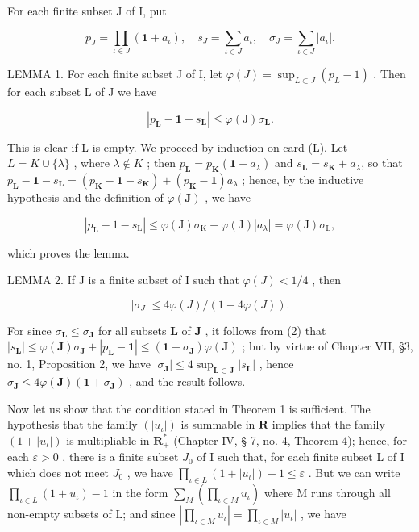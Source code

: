 For each finite subset J of I, put

\[
p _ {J} = \prod_ {\iota \in J} (\mathbf{1} + a _ {\iota}), \quad s _ {J} = \sum_ {\iota \in J} a _ {\iota}, \quad \sigma_ {J} = \sum_ {\iota \in J} | a _ {\iota} |.
\]

LEMMA 1. For each finite subset J of I, let \(\varphi(J) = \sup_{L \subset J} (p_L - 1)\) . Then for each subset L of J we have

\[
\left| p _ {\mathbf {L}} - \mathbf {1} - s _ {\mathbf {L}} \right| \leqslant \varphi (\mathrm{J}) \sigma_ {\mathbf {L}}.\tag{2}
\]

This is clear if L is empty. We proceed by induction on card (L). Let \(L = K \cup \{\lambda\}\) , where \(\lambda \notin K\) ; then \(p_{\mathbf{L}} = p_{\mathbf{K}}(\mathbf{1} + a_{\lambda})\) and \(s_{\mathbf{L}} = s_{\mathbf{K}} + a_{\lambda}\), so that \(p_{\mathbf{L}} - \mathbf{1} - s_{\mathbf{L}} = (p_{\mathbf{K}} - \mathbf{1} - s_{\mathbf{K}}) + (p_{\mathbf{K}} - \mathbf{1})a_{\lambda}\) ; hence, by the inductive hypothesis and the definition of \(\varphi(\mathbf{J})\) , we have

\[
\left| p _ {\mathrm{L}} - \mathrm{1} - s _ {\mathrm{L}} \right| \leqslant \varphi (\mathrm{J}) \sigma_ {\mathrm{K}} + \varphi (\mathrm{J}) \left| a _ {\lambda} \right| = \varphi (\mathrm{J}) \sigma_ {\mathrm{L}},
\]

which proves the lemma.

LEMMA 2. If J is a finite subset of I such that \(\varphi(J) < 1/4\) , then

\[
\left| \sigma_ {J} \right| \leqslant 4 \varphi (J) / (1 - 4 \varphi (J)).
\]

For since \(\sigma_{\mathbf{L}} \leqslant \sigma_{\mathbf{J}}\) for all subsets \(\mathbf{L}\) of \(\mathbf{J}\) , it follows from (2) that \(|s_{\mathbf{L}}| \leqslant \varphi(\mathbf{J})\sigma_{\mathbf{J}} + |p_{\mathbf{L}} - \mathbf{1}| \leqslant (\mathbf{1} + \sigma_{\mathbf{J}})\varphi(\mathbf{J})\) ; but by virtue of Chapter VII, §3, no. 1, Proposition 2, we have \(|\sigma_{\mathbf{J}}| \leqslant 4\sup_{\mathbf{L} \subset \mathbf{J}} |s_{\mathbf{L}}|\) , hence \(\sigma_{\mathbf{J}} \leqslant 4\varphi(\mathbf{J})(\mathbf{1} + \sigma_{\mathbf{J}})\) , and the result follows.

Now let us show that the condition stated in Theorem 1 is sufficient. The hypothesis that the family \((|u_{\iota}|)\) is summable in \(\mathbf{R}\) implies that the family \((\mathrm{1} + |u_{\iota}|)\) is multipliable in \(\mathbf{R}_{+}^{*}\) (Chapter IV, § 7, no. 4, Theorem 4); hence, for each \(\varepsilon > 0\) , there is a finite subset \(J_{0}\) of I such that, for each finite subset L of I which does not meet \(J_{0}\) , we have \(\prod_{\iota \in L} (\mathrm{1} + |u_{\iota}|) - \mathrm{1} \leqslant \varepsilon\) . But we can write \(\prod_{\iota \in L} (\mathrm{1} + u_{\iota}) - \mathrm{1}\) in the form \(\sum_{M} \left( \prod_{\iota \in M} u_{\iota} \right)\) where M runs through all non-empty subsets of L; and since \(\left| \prod_{\iota \in M} u_{\iota} \right| = \prod_{\iota \in M} |u_{\iota}|\) , we have

